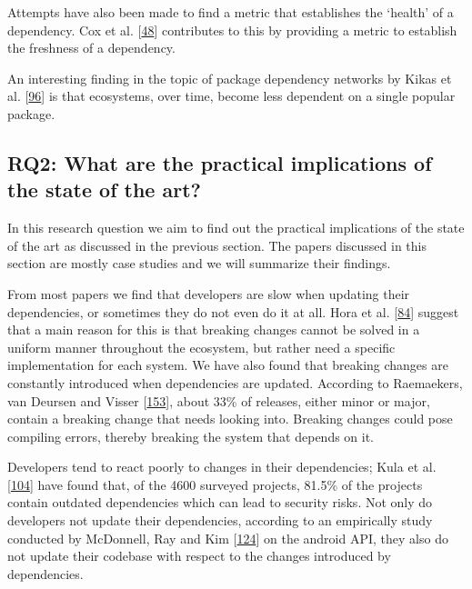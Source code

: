 \documentclass[]{book}
\begin{document}
Attempts have also been made to find a metric that establishes the
`health' of a dependency. Cox et al.
{[}\protect\hyperlink{ref-Cox2015}{48}{]} contributes to this by
providing a metric to establish the freshness of a dependency.

An interesting finding in the topic of package dependency networks by
Kikas et al. {[}\protect\hyperlink{ref-Kikas2017}{96}{]} is that
ecosystems, over time, become less dependent on a single popular
package.

\subsection{RQ2: What are the practical implications of the state of the
art?}\label{rq2-what-are-the-practical-implications-of-the-state-of-the-art}

In this research question we aim to find out the practical implications
of the state of the art as discussed in the previous section. The papers
discussed in this section are mostly case studies and we will summarize
their findings.

From most papers we find that developers are slow when updating their
dependencies, or sometimes they do not even do it at all. Hora et al.
{[}\protect\hyperlink{ref-Hora2016}{84}{]} suggest that a main reason
for this is that breaking changes cannot be solved in a uniform manner
throughout the ecosystem, but rather need a specific implementation for
each system. We have also found that breaking changes are constantly
introduced when dependencies are updated. According to Raemaekers, van
Deursen and Visser {[}\protect\hyperlink{ref-Raemaekers2017}{153}{]},
about 33\% of releases, either minor or major, contain a breaking change
that needs looking into. Breaking changes could pose compiling errors,
thereby breaking the system that depends on it.

Developers tend to react poorly to changes in their dependencies; Kula
et al. {[}\protect\hyperlink{ref-Kula2017}{104}{]} have found that, of
the 4600 surveyed projects, 81.5\% of the projects contain outdated
dependencies which can lead to security risks. Not only do developers
not update their dependencies, according to an empirically study
conducted by McDonnell, Ray and Kim
{[}\protect\hyperlink{ref-McDonnell2013}{124}{]} on the android API,
they also do not update their codebase with respect to the changes
introduced by dependencies.
\end{document}
